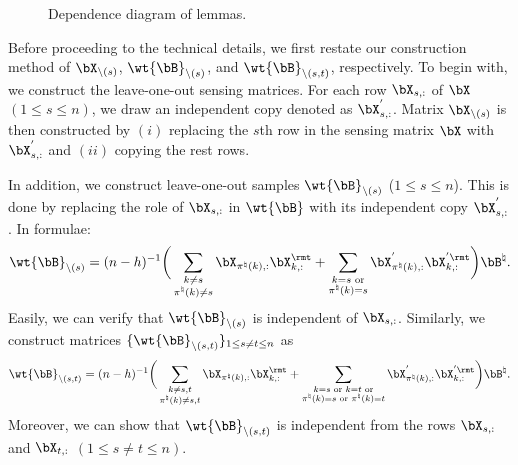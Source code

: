 \documentclass[11pt]{article}
\def \bBtrue {\bB^{\natural}}
\def\wtminus#1#2{\wt{#1}_{\setminus (#2)}}
\def\sampminus#1#2{#1_{\setminus (#2)}}
\begin{document}
\begin{figure}[!ht]
\caption{Dependence diagram of lemmas.}
\label{fig:dependence_diagram}
\end{figure}

Before proceeding to the technical details, we first restate
our construction method of $\sampminus{\bX}{s}$,
$\wtminus{\bB}{s}$, and $\wtminus{\bB}{s,t}$, respectively.
To begin with, we construct the leave-one-out
sensing matrices. For each row $\bX_{s, :}$ of $\bX$ $(1\leq s \leq n)$,
we draw an independent copy denoted as
$\bX_{s, :}^{'}$. Matrix $\sampminus{\bX}{s}$
is then constructed by $(i)$ replacing the $s$th row in the sensing matrix $\bX$ with $\bX_{s, :}^{'}$ and $(ii)$ copying the rest rows.

In addition, we construct leave-one-out samples $\wtminus{\bB}{s}$ ($1\leq s \leq n$).
This is done by replacing the role of $\bX_{s,:}$ in $\wt{\bB}$ with
its independent copy $\bX_{s, :}^{'}$.
In formulae:
\[
\wtminus{\bB}{s} =
(n-h)^{-1}\bigg(
\sum_{\substack{k \neq s \\ \pi^{\natural}(k) \neq s}} \bX_{\pi^{\natural}(k), :}\bX_{k, :}^{\rmt}
+ \sum_{\substack{k = s \textup{ or} \\  \pi^{\natural}(k) = s}} {\bX}^{'}_{\pi^{\natural}(k), :}{\bX}^{'\rmt}_{k, :}\bigg)\bBtrue.
\]
Easily, we can verify that $\wtminus{\bB}{s}$ is independent of
$\bX_{s, :}$. Similarly, we construct matrices
$\{\wtminus{\bB}{s, t}\}_{1\leq s\neq t \leq n}$ as
\[
\wtminus{\bB}{s, t} =
(n-h)^{-1}\bigg(
\sum_{\substack{k \neq s, t\\ \pi^{\natural}(k) \neq s,t }} \bX_{\pi^{\natural}(k), :}\bX_{k, :}^{\rmt}
+ \sum_{\substack{k = s \textup{ or } k = t \textup{ or} \\ \pi^{\natural}(k) =s
  \textup{ or }\pi^{\natural}(k) = t}} {\bX}^{'}_{\pi^{\natural}(k), :}{\bX}^{'\rmt}_{k, :}\bigg)\bBtrue.
\]
Moreover, we can show that $\wtminus{\bB}{s, t}$ is independent from
the rows $\bX_{s, :}$ and $\bX_{t, :}$ $(1\leq s\neq t \leq n)$.
\end{document}
